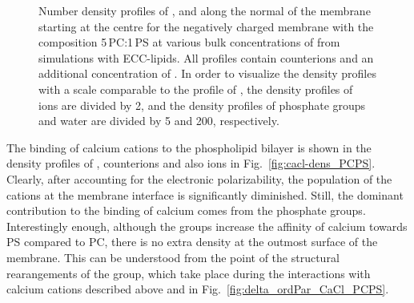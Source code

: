 \documentclass[journal=jpcbfk,manuscript=article]{achemso}
\begin{document}
\begin{figure}[htbp!]
{    Number density profiles of ,  and  along the normal of the membrane starting at the centre
    for the negatively charged membrane with the composition 5\,PC:1\,PS
    at various bulk concentrations of  from simulations with ECC-lipids. 
    All profiles contain  counterions and an additional concentration of . 
    In order to visualize the density profiles with a scale comparable to the profile of ,  
    the density profiles of~ ions are divided by 2, and 
    the density profiles of phosphate groups and water are divided by 5 and 200, respectively.  
  }
\end{figure} 
 

The binding of calcium cations to the phospholipid bilayer is shown 
in the density profiles of ,  counterions 
and also  ions in Fig.~\ref{fig:cacl-dens_PCPS}. 
Clearly, after accounting for the electronic polarizability, 
the population of the cations at the membrane interface is significantly diminished. 
Still, the dominant contribution to the binding of calcium comes from the phosphate groups. 
Interestingly enough,
although the  groups increase the affinity of calcium towards PS compared to PC,
 there is no extra density at the outmost surface of the membrane. 
This can be understood from the point of the structural rearangements of the  group, 
which take place during the interactions with calcium cations
described above and in Fig.~\ref{fig:delta_ordPar_CaCl_PCPS}. 


\end{document}
